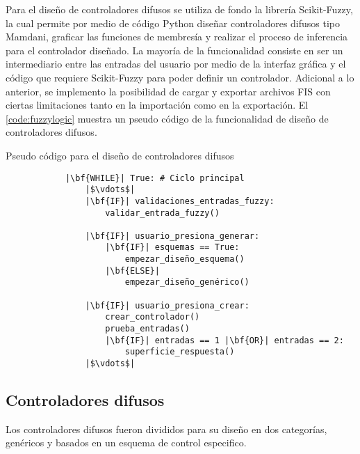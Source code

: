     Para el diseño de controladores difusos se utiliza de fondo la librería Scikit-Fuzzy, la cual permite por medio de código Python diseñar controladores difusos tipo Mamdani, graficar las funciones de membresía y realizar el proceso de inferencia para el controlador diseñado. La mayoría de la funcionalidad consiste en ser un intermediario entre las entradas del usuario por medio de la interfaz gráfica y el código que requiere Scikit-Fuzzy para poder definir un controlador. Adicional a lo anterior, se implemento la posibilidad de cargar y exportar archivos FIS con ciertas limitaciones tanto en la importación como en la exportación. El \cref{code:fuzzylogic} muestra un pseudo código de la funcionalidad de diseño de controladores difusos.
    
    \pagebreak

    \begin{longlisting}
        \caption{Pseudo código para el diseño de controladores difusos}
        \label{code:fuzzylogic}				
        \begin{verbatim}
            |\bf{WHILE}| True: # Ciclo principal
                |$\vdots$|
                |\bf{IF}| validaciones_entradas_fuzzy:
                    validar_entrada_fuzzy()
                
                |\bf{IF}| usuario_presiona_generar:
                    |\bf{IF}| esquemas == True:
                        empezar_diseño_esquema()
                    |\bf{ELSE}|
                        empezar_diseño_genérico()
                
                |\bf{IF}| usuario_presiona_crear:
                    crear_controlador()
                    prueba_entradas()
                    |\bf{IF}| entradas == 1 |\bf{OR}| entradas == 2:
                        superficie_respuesta()
                |$\vdots$|
        \end{verbatim}
    \end{longlisting}
    
    \subsection{Controladores difusos}

        Los controladores difusos fueron divididos para su diseño en dos categorías, genéricos y basados en un esquema de control especifico.
        
